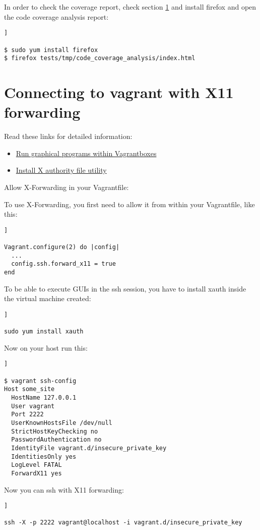 In order to check the coverage report, check section \ref{x11_forwarding} and install firefox and open the code coverage analysis report:

\begin{lstlisting}[breaklines=true, style=bash]]

$ sudo yum install firefox
$ firefox tests/tmp/code_coverage_analysis/index.html

\end{lstlisting}

\section {Connecting to vagrant with X11 forwarding}\label{x11_forwarding}

Read these links for detailed information:

\begin{itemize}

\item \href{https://coderwall.com/p/ozhfva/run-graphical-programs-within-vagrantboxes}{Run graphical programs within Vagrantboxes} 
\item \href{https://www.cyberciti.biz/faq/how-to-fix-x11-forwarding-request-failed-on-channel-0/}{Install X authority file utility} 

\end{itemize}

Allow X-Forwarding in your Vagrantfile:

To use X-Forwarding, you first need to allow it from within your Vagrantfile, like this:

\begin{lstlisting}[breaklines=true, style=bash]]

Vagrant.configure(2) do |config|
  ...
  config.ssh.forward_x11 = true
end

\end{lstlisting}

To be able to execute GUIs in the ssh session, you have to install xauth inside the virtual machine created:

\begin{lstlisting}[breaklines=true, style=bash]]

sudo yum install xauth

\end{lstlisting}

Now on your host run this:

\begin{lstlisting}[breaklines=true, style=bash]]

$ vagrant ssh-config
Host some_site
  HostName 127.0.0.1
  User vagrant
  Port 2222
  UserKnownHostsFile /dev/null
  StrictHostKeyChecking no
  PasswordAuthentication no
  IdentityFile vagrant.d/insecure_private_key
  IdentitiesOnly yes
  LogLevel FATAL
  ForwardX11 yes

\end{lstlisting}

Now you can ssh with X11 forwarding:

\begin{lstlisting}[breaklines=true, style=bash]]

ssh -X -p 2222 vagrant@localhost -i vagrant.d/insecure_private_key

\end{lstlisting}

